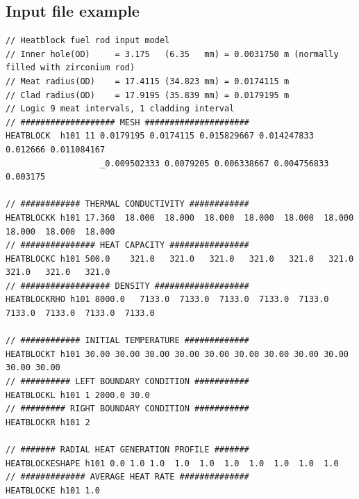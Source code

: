 \documentclass[11pt,letterpaper,titlepage]{article}
\begin{document}
\newpage
\begin{landscape}


\subsection{Input file example}

\begin{verbatim}
// Heatblock fuel rod input model
// Inner hole(OD)     = 3.175   (6.35   mm) = 0.0031750 m (normally filled with zirconium rod)
// Meat radius(OD)    = 17.4115 (34.823 mm) = 0.0174115 m
// Clad radius(OD)    = 17.9195 (35.839 mm) = 0.0179195 m
// Logic 9 meat intervals, 1 cladding interval
// ################### MESH #####################
HEATBLOCK  h101 11 0.0179195 0.0174115 0.015829667 0.014247833 0.012666 0.011084167 
                   _0.009502333 0.0079205 0.006338667 0.004756833 0.003175

// ############ THERMAL CONDUCTIVITY ############
HEATBLOCKK h101 17.360  18.000  18.000  18.000  18.000  18.000  18.000  18.000  18.000  18.000
// ############### HEAT CAPACITY ################
HEATBLOCKC h101 500.0    321.0   321.0   321.0   321.0   321.0   321.0   321.0   321.0   321.0
// ################## DENSITY ###################
HEATBLOCKRHO h101 8000.0   7133.0  7133.0  7133.0  7133.0  7133.0  7133.0  7133.0  7133.0  7133.0

// ############ INITIAL TEMPERATURE #############
HEATBLOCKT h101 30.00 30.00 30.00 30.00 30.00 30.00 30.00 30.00 30.00 30.00 30.00
// ########## LEFT BOUNDARY CONDITION ###########
HEATBLOCKL h101 1 2000.0 30.0
// ######### RIGHT BOUNDARY CONDITION ###########
HEATBLOCKR h101 2

// ####### RADIAL HEAT GENERATION PROFILE #######
HEATBLOCKESHAPE h101 0.0 1.0 1.0  1.0  1.0  1.0  1.0  1.0  1.0  1.0   
// ############# AVERAGE HEAT RATE ##############
HEATBLOCKE h101 1.0
\end{verbatim}
\end{landscape}



\newpage
{}
\end{document}
